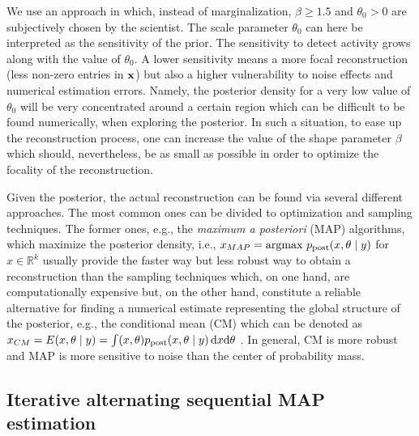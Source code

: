 \documentclass[5p]{elsarticle}
\begin{document}
We use an approach in which, instead of marginalization, $\beta \geq 1.5$ and $\theta_0 > 0$ are subjectively chosen by the scientist. The scale parameter $\theta_0$ can here be interpreted as the sensitivity of the prior. The sensitivity to detect activity  grows along with the value of $\theta_0$. A lower sensitivity means a more focal reconstruction (less non-zero entries in ${\bf x}$) but also a higher vulnerability to noise effects and numerical estimation errors. Namely, the posterior density for a very low  value of $\theta_0$ will be very concentrated around a certain region which can be difficult to be found numerically, when exploring the posterior. In such a situation, to ease up the reconstruction process, one can increase the value of the shape parameter $\beta$ which should, nevertheless, be as small as possible in order to optimize the focality of the reconstruction.  

Given the posterior, the actual reconstruction can be found via several different approaches. The most common ones can be divided to optimization and sampling techniques. The former ones, e.g., the {\em maximum a posteriori} (MAP) algorithms, which maximize the posterior density, i.e., 
$ x_{MAP} = \hbox{argmax } p_{\hbox{\scriptsize post}}(x, \theta\mid y)$
for $x\in\mathbb{R}^k$ \cite{lucka2012} usually provide the faster way but less robust way to obtain a reconstruction than the sampling techniques which, on one hand, are computationally expensive but, on the other hand, constitute a reliable alternative for finding a numerical estimate representing the global structure of the posterior, e.g., the conditional mean (CM) which can be denoted as $x_{CM} = E(x,\theta\mid y)= \int (x,\theta)p_{\hbox{\scriptsize post}}(x,\theta \mid y) \, \hbox{d} x \hbox{d} \theta$ \cite{calvetti2009}. In general, CM is more robust and MAP is more sensitive to noise than the center of probability mass.

\subsection{Iterative alternating sequential MAP estimation}
\end{document}
